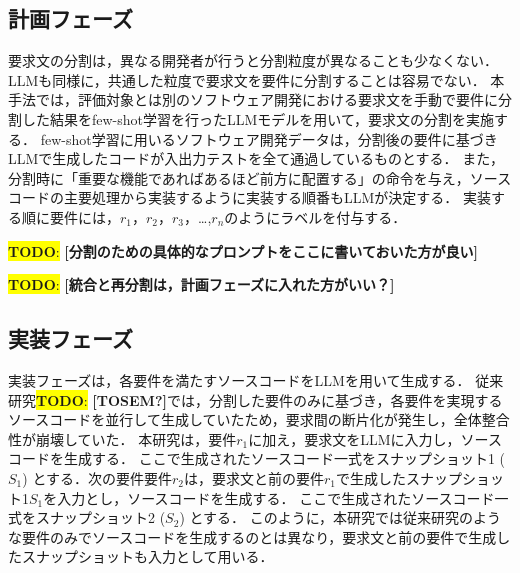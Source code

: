 \documentclass[submit,techrep,noauthor]{ipsj}
\newcommand{\todo}[1]{\colorbox{yellow}{{\bf TODO}:}{\color{red} {\textbf{[#1]}}}}
\begin{document}
\subsection{計画フェーズ}
要求文の分割は，異なる開発者が行うと分割粒度が異なることも少なくない\cite{split_size}．LLMも同様に，共通した粒度で要求文を要件に分割することは容易でない．
本手法では，評価対象とは別のソフトウェア開発における要求文を手動で要件に分割した結果をfew-shot学習を行ったLLMモデルを用いて，要求文の分割を実施する．
few-shot学習に用いるソフトウェア開発データは，分割後の要件に基づきLLMで生成したコードが入出力テストを全て通過しているものとする．
また，分割時に「重要な機能であればあるほど前方に配置する」の命令を与え，ソースコードの主要処理から実装するように実装する順番もLLMが決定する．
実装する順に要件には，$r_1$，$r_2$，$r_3$，\dots,$r_n$のようにラベルを付与する．

\todo{分割のための具体的なプロンプトをここに書いておいた方が良い}


\todo{統合と再分割は，計画フェーズに入れた方がいい？}


\subsection{実装フェーズ}

実装フェーズは，各要件を満たすソースコードをLLMを用いて生成する．
従来研究\todo{TOSEM?}では，分割した要件のみに基づき，各要件を実現するソースコードを並行して生成していたため，要求間の断片化が発生し，全体整合性が崩壊していた．
本研究は，要件$r_1$に加え，要求文をLLMに入力し，ソースコードを生成する．
ここで生成されたソースコード一式をスナップショット1 ($S_1$) とする．次の要件要件$r_2$は，要求文と前の要件$r_1$で生成したスナップショット1$S_1$を入力とし，ソースコードを生成する．
ここで生成されたソースコード一式をスナップショット2 ($S_2$) とする．
このように，本研究では従来研究のような要件のみでソースコードを生成するのとは異なり，要求文と前の要件で生成したスナップショットも入力として用いる．
\end{document}
